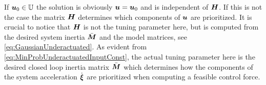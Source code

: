 If $\boldsymbol{u}_0 \in \mathbb{U}$ the solution is obviously $\boldsymbol{u} = \boldsymbol{u}_0$ and is independent of $\boldsymbol{H}$.
If this is not the case the matrix $\boldsymbol{H}$ determines which components of $\boldsymbol{u}$ are prioritized.
It is crucial to notice that $\boldsymbol{H}$ is not the tuning parameter here, but is computed from the desired system inertia $\bar{\boldsymbol{M}}$ and the model matrices, see \eqref{eq:GaussianUnderactuated}.
As evident from \eqref{eq:MinProbUnderactuatedInputConst}, the actual tuning parameter here is the desired closed loop inertia matrix $\bar{\boldsymbol{M}}$ which determines how the components of the system acceleration $\dot{\boldsymbol{\xi}}$ are prioritized when computing a feasible control force.
